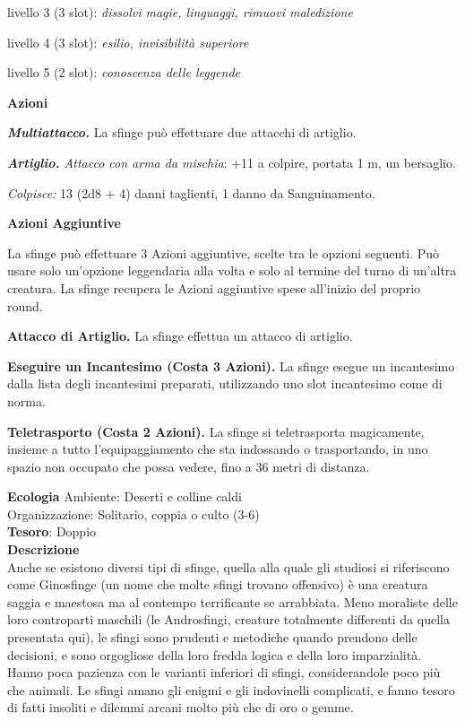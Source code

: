 \begin{multicols}{2}
livello 3 (3 slot): \textit{dissolvi magie, linguaggi, rimuovi maledizione}

livello 4 (3 slot): \textit{esilio, invisibilità superiore}

livello 5 (2 slot): \textit{conoscenza delle leggende}

\textbf{Azioni}

\textit{\textbf{Multiattacco.}} La sfinge può effettuare due attacchi di artiglio.

\textit{\textbf{Artiglio.} Attacco con arma da mischia}: +11 a colpire, portata 1 m, un bersaglio.

\textit{Colpisce:} 13 (2d8 + 4) danni taglienti, 1 danno da Sanguinamento.

\textbf{Azioni Aggiuntive}

La sfinge può effettuare 3 Azioni aggiuntive, scelte tra le opzioni seguenti. Può usare solo un'opzione leggendaria alla volta e solo al termine del turno di un'altra creatura. La sfinge recupera le Azioni aggiuntive spese all'inizio del proprio round.

\textbf{Attacco di Artiglio.} La sfinge effettua un attacco di artiglio.

\textbf{Eseguire un Incantesimo (Costa 3 Azioni).} La sfinge esegue un incantesimo dalla lista degli incantesimi preparati, utilizzando uno slot incantesimo come di norma.

\textbf{Teletrasporto (Costa 2 Azioni).} La sfinge si teletrasporta magicamente, insieme a tutto l'equipaggiamento che sta indossando o trasportando, in uno spazio non occupato che possa vedere, fino a 36 metri di distanza.

\textbf{Ecologia}
Ambiente: Deserti e colline caldi\\
Organizzazione: Solitario, coppia o culto (3-6)\\
\textbf{Tesoro}: Doppio\\
\textbf{Descrizione}\\
Anche se esistono diversi tipi di sfinge, quella alla quale gli studiosi si riferiscono come Ginosfinge (un nome che molte sfingi trovano offensivo) è una creatura saggia e maestosa ma al contempo terrificante se arrabbiata. Meno moraliste delle loro controparti maschili (le Androsfingi, creature totalmente differenti da quella presentata qui), le sfingi sono prudenti e metodiche quando prendono delle decisioni, e sono orgogliose della loro fredda logica e della loro imparzialità. Hanno poca pazienza con le varianti inferiori di sfingi, considerandole poco più che animali. Le sfingi amano gli enigmi e gli indovinelli complicati, e fanno tesoro di fatti insoliti e dilemmi arcani molto più che di oro o gemme.


\end{multicols}
